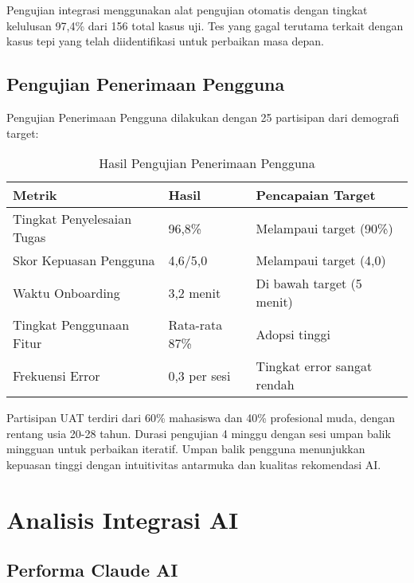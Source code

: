 Pengujian integrasi menggunakan alat pengujian otomatis dengan tingkat kelulusan 97,4\% dari 156 total kasus uji. Tes yang gagal terutama terkait dengan kasus tepi yang telah diidentifikasi untuk perbaikan masa depan.

\subsection{Pengujian Penerimaan Pengguna}

Pengujian Penerimaan Pengguna dilakukan dengan 25 partisipan dari demografi target:

\begin{table}[ht]
\centering
\caption{Hasil Pengujian Penerimaan Pengguna}
\label{tab:uat-results}
\footnotesize
\begin{adjustbox}{width=\textwidth,center}
\begin{tabular}{@{}p{4cm}p{3cm}p{6cm}@{}}
\toprule
\textbf{Metrik} & \textbf{Hasil} & \textbf{Pencapaian Target} \\
\midrule
Tingkat Penyelesaian Tugas & 96,8\% & Melampaui target (90\%) \\
\hline
Skor Kepuasan Pengguna & 4,6/5,0 & Melampaui target (4,0) \\
\hline
Waktu Onboarding & 3,2 menit & Di bawah target (5 menit) \\
\hline
Tingkat Penggunaan Fitur & Rata-rata 87\% & Adopsi tinggi \\
\hline
Frekuensi Error & 0,3 per sesi & Tingkat error sangat rendah \\
\bottomrule
\end{tabular}
\end{adjustbox}
\end{table}

Partisipan UAT terdiri dari 60\% mahasiswa dan 40\% profesional muda, dengan rentang usia 20-28 tahun. Durasi pengujian 4 minggu dengan sesi umpan balik mingguan untuk perbaikan iteratif. Umpan balik pengguna menunjukkan kepuasan tinggi dengan intuitivitas antarmuka dan kualitas rekomendasi AI.

\section{Analisis Integrasi AI}

\subsection{Performa Claude AI}

